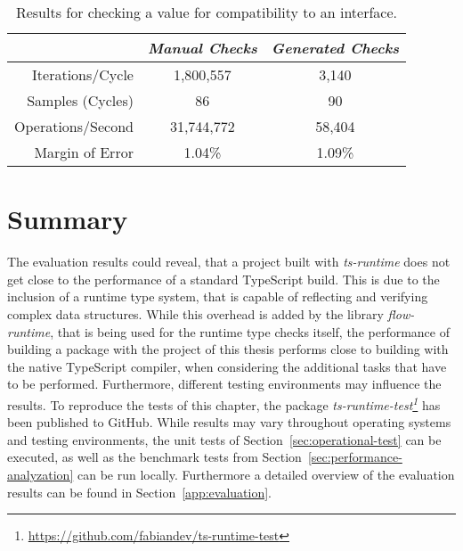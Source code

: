 \begin{table}[ht]
\begin{subtable}[ht]{1.0\textwidth}
    \setlength{\tabcolsep}{5mm}
    \def\arraystretch{1.25}
    \centering
    \begin{tabular}{|r||c|c|}
      \hline
      & \emph{Manual Checks} & \emph{Generated Checks} \\
      \hline
      \hline
      Iterations/Cycle & 1,800,557 & 3,140 \\
      \hline
      Samples (Cycles) & 86 & 90 \\
      \hline
      Operations/Second & 31,744,772 & 58,404 \\
      \hline
      Margin of Error & 1.04\% & 1.09\% \\
      \hline
    \end{tabular}
    \caption{Results for checking a value for compatibility to an interface.}
    \label{tab:benchmarks:interface}
  \end{subtable}
\end{table}

\section{Summary}
\label{sec:evaluation-summary}

The evaluation results could reveal, that a project built with \emph{ts-runtime} does not get close to the performance of a standard TypeScript build. This is due to the inclusion of a runtime type system, that is capable of reflecting and verifying complex data structures. While this overhead is added by the library \emph{flow-runtime}, that is being used for the runtime type checks itself, the performance of building a package with the project of this thesis performs close to building with the native TypeScript compiler, when considering the additional tasks that have to be performed. Furthermore, different testing environments may influence the results. To reproduce the tests of this chapter, the package \emph{ts-runtime-test\footnote{\url{https://github.com/fabiandev/ts-runtime-test}}} has been published to GitHub. While results may vary throughout operating systems and testing environments, the unit tests of Section~\ref{sec:operational-test} can be executed, as well as the benchmark tests from Section~\ref{sec:performance-analyzation} can be run locally. Furthermore a detailed overview of the evaluation results can be found in Section~\ref{app:evaluation}.
